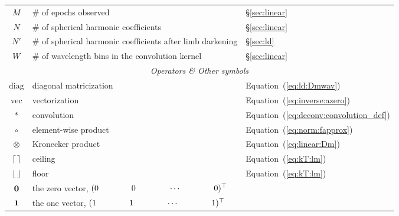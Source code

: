 \documentclass[modern]{aastex631}
\begin{document}
\begin{center}
\begin{longtable}{cll}
        $M$                                                 & \# of epochs observed                                        & \S\ref{sec:linear}                         \\
        $N$                                                 & \# of spherical harmonic coefficients                        & \S\ref{sec:linear}                         \\
        $N'$                                                & \# of spherical harmonic coefficients after limb darkening   & \S\ref{sec:ld}                             \\
        $W$                                                 & \# of wavelength bins in the convolution kernel              & \S\ref{sec:linear}                         \\
        \midrule
        \multicolumn{3}{c}{\emph{Operators \& Other symbols}}                                                                                                           \\
        \midrule
        $\mathrm{diag}$                                     & diagonal matricization                                       & Equation~(\ref{eq:ld:Dmwav})               \\
        $\mathrm{vec}$                                      & vectorization                                                & Equation~(\ref{eq:inverse:azero})          \\
        $*$                                                 & convolution                                                  & Equation~(\ref{eq:deconv:convolution_def}) \\
        $\circ$                                             & element-wise product                                         & Equation~(\ref{eq:norm:fapprox})           \\
        $\otimes$                                           & Kronecker product                                            & Equation~(\ref{eq:linear:Dm})              \\
        $\ceil*{\,}$                                        & ceiling                                                      & Equation~(\ref{eq:kT:lm})                  \\
        $\floor*{\,}$                                       & floor                                                        & Equation~(\ref{eq:kT:lm})                  \\
        $\bvec{0}$                                          & the zero vector, $(0 \quadquad 0 \quadquad \cdots \quadquad 0)^\top$ &                                                                                                           \\
        $\bvec{1}$                                          & the one vector, $(1 \quadquad 1 \quadquad \cdots \quadquad 1)^\top$ &                                                                                                           \\
    \end{longtable}
\end{center}

\clearpage

\end{document}
